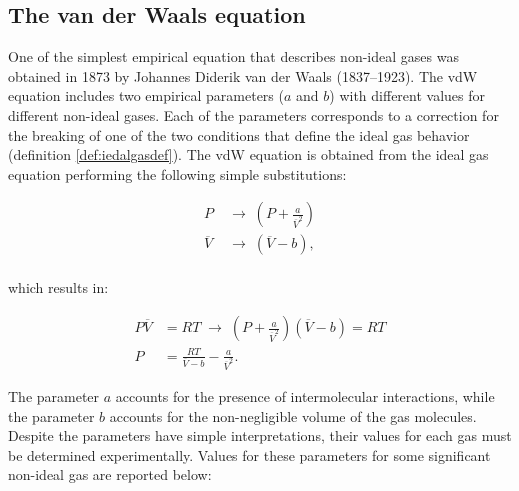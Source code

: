 \documentclass[
  9pt,
]{extbook}
\theoremstyle{definition}
\theoremstyle{definition}
\theoremstyle{definition}
\theoremstyle{remark}
\begin{document}
\hypertarget{the-van-der-waals-equation}{%
\subsection{The van der Waals equation}\label{the-van-der-waals-equation}}

One of the simplest empirical equation that describes non-ideal gases was obtained in 1873 by Johannes Diderik van der Waals (1837--1923). The vdW equation includes two empirical parameters (\(a\) and \(b\)) with different values for different non-ideal gases. Each of the parameters corresponds to a correction for the breaking of one of the two conditions that define the ideal gas behavior (definition \ref{def:iedalgasdef}). The vdW equation is obtained from the ideal gas equation performing the following simple substitutions:

\begin{equation}
\begin{aligned}
P & \;\rightarrow\;\left( P + \frac{a}{\overline{V}^2} \right)\\
\overline{V} & \;\rightarrow\;\left( \overline{V} - b\right),\\
\end{aligned}
\label{eq:vdWeq1}
\end{equation}

which results in:

\begin{equation}
\begin{aligned}
P\overline{V} &=RT \; \rightarrow \; \left( P + \frac{a}{\overline{V}^2} \right)\left( \overline{V} - b\right)=RT\\
P &=\frac{RT}{\overline{V} - b}-\frac{a}{\overline{V}^2}.
\end{aligned}
\label{eq:vdWeq2}
\end{equation}

The parameter \(a\) accounts for the presence of intermolecular interactions, while the parameter \(b\) accounts for the non-negligible volume of the gas molecules. Despite the parameters have simple interpretations, their values for each gas must be determined experimentally. Values for these parameters for some significant non-ideal gas are reported below:

\scriptsize
\end{document}

